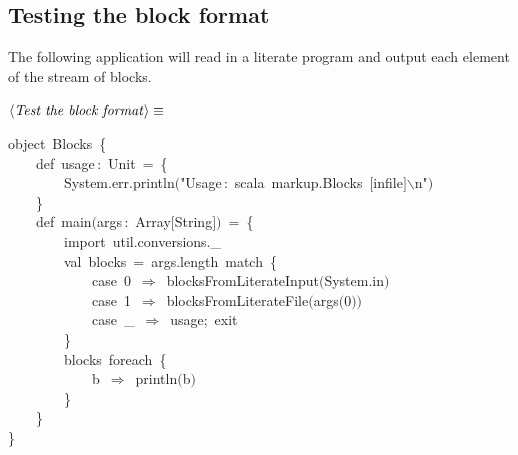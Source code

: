 \documentclass[a4paper,12pt]{article}
\begin{document}
\subsection{Testing the block format}
The following application will read in a literate program and output
each element of the stream of blocks.

$\left<\mbox{\emph{Test the block format}}\right>\equiv$
\begin{program}{\vem object}~Blocks~{\small\{}
\\~~~~{\vem def}~usage\,{\rm :}~Unit~=~{\small\{}
\\~~~~~~~~System.err.println$($"Usage\,{\rm :}~scala~markup.Blocks~$[$infile$]$$\backslash$n"$)$
\\~~~~{\small\}}
\\[0.5em]~~~~{\vem def}~main$($args\,{\rm :}~Array$[$String$]$$)$~=~{\small\{}
\\~~~~~~~~{\vem import}~util.conversions.\_
\\[0.5em]~~~~~~~~{\vem val}~blocks~=~args.length~{\vem match}~{\small\{}
\\~~~~~~~~~~~~{\vem case}~0~$\Rightarrow$~blocksFromLiterateInput$($System.in$)$
\\~~~~~~~~~~~~{\vem case}~1~$\Rightarrow$~blocksFromLiterateFile$($args$($0$)$$)$
\\~~~~~~~~~~~~{\vem case}~\_~$\Rightarrow$~usage;~exit
\\~~~~~~~~{\small\}}
\\[0.5em]~~~~~~~~blocks~foreach~{\small\{}
\\~~~~~~~~~~~~b~$\Rightarrow$~println$($b$)$
\\~~~~~~~~{\small\}}
\\~~~~{\small\}}
\\{\small\}}
\end{program}
\end{document}
